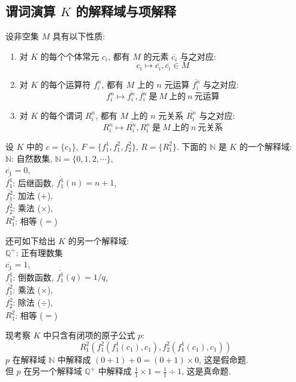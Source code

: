 \documentclass[
    mode=hazy,
    color=blue,
    device=normal,
    lang=cn
]{elegantnote}
\begin{document}
\subsection{谓词演算 \texorpdfstring{$K$}{K} 的解释域与项解释}
\begin{definition}[$K$ 的解释域]
    设非空集 $M$ 具有以下性质:
    \begin{enumerate}[label = $\arabic*^\circ$]
        \item 对 $K$ 的每个个体常元 $c_i$, 都有 $M$ 的元素 $\overline{c_i}$ 与之对应: $$c_i\mapsto \overline{c_i}, \overline{c_i}\in M$$
        \item 对 $K$ 的每个运算符 $f_i^n$, 都有 $M$ 上的 $n$ 元运算 $\overline{f_i^n}$ 与之对应: $$f_i^n\mapsto \overline{f_i^n}, \overline{f_i^n}\ \text{是}\ M\ \text{上的}\ n\ \text{元运算}$$
        \item 对 $K$ 的每个谓词 $R_i^n$, 都有 $M$ 上的 $n$ 元关系 $\overline{R_i^n}$ 与之对应: $$R_i^n\mapsto \overline{R_i^n}, \overline{R_i^n}\ \text{是}\ M\ \text{上的}\ n\ \text{元关系}$$
    \end{enumerate}
\end{definition}
\begin{example}
    设 $K$ 中的 $c = \{c_1\}$, $F=\{f_1^1, f_1^2, f_2^2\}$, $R=\{R_1^2\}$. 下面的 $\mathbb{N}$ 是 $K$ 的一个解释域:\\
    $\mathbb{N}$: 自然数集, $\mathbb{N}=\{0, 1, 2, \cdots\}$,\\
    $\overline{c_1}=0$,\\
    $\overline{f_1^1}$: 后继函数, $\overline{f_1^1}(n)=n+1$,\\
    $\overline{f_1^2}$: 加法 ($+$),\\
    $\overline{f_2^2}$: 乘法 ($\times$),\\
    $\overline{R_1^2}$: 相等 ($=$)

    还可如下给出 $K$ 的另一个解释域:\\
    $\mathbb{Q}^+$: 正有理数集\\
    $\overline{c_1}=1$,\\
    $\overline{f_1^1}$: 倒数函数, $\overline{f_1^1}(q)=1/q$,\\
    $\overline{f_1^2}$: 乘法 ($\times$),\\
    $\overline{f_2^2}$: 除法 ($\div$),\\
    $\overline{R_1^2}$: 相等 ($=$)

    现考察 $K$ 中只含有闭项的原子公式 $p$:
    $$
        R_1^2(f_1^2(f_1^1(c_1), c_1), f_2^2(f_1^1(c_1), c_1))
    $$
    $p$ 在解释域 $\mathbb{N}$ 中解释成 $(0+1)+0=(0+1)\times 0$, 这是假命题.\\
    但 $p$ 在另一个解释域 $\mathbb{Q}^+$ 中解释成 $\displaystyle \frac{1}{1}\times 1 = \frac{1}{1}\div 1$, 这是真命题.
\end{example}
\end{document}
